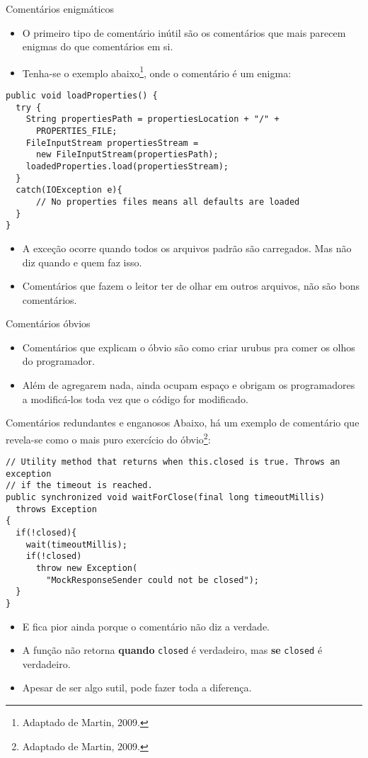 \documentclass[11pt]{beamer}
\begin{document}
  \begin{frame}[fragile]{Comentários enigmáticos}
    \begin{itemize}
      \item O primeiro tipo de comentário inútil são os comentários que mais parecem enigmas do que comentários em si.
      \item Tenha-se o exemplo abaixo\footnote{Adaptado de Martin, 2009.}, onde o comentário é um enigma: 
    \end{itemize}
    \begin{lstlisting}[basicstyle=\tiny]
public void loadProperties() {
  try {
    String propertiesPath = propertiesLocation + "/" +
      PROPERTIES_FILE;
    FileInputStream propertiesStream = 
      new FileInputStream(propertiesPath);
    loadedProperties.load(propertiesStream);
  }
  catch(IOException e){
      // No properties files means all defaults are loaded
  }
}
    \end{lstlisting}
    \begin{itemize}
      \item A exceção ocorre quando todos os arquivos padrão são carregados. Mas não diz quando e quem faz isso.
      \item Comentários que fazem o leitor ter de olhar em outros arquivos, não são bons comentários.
    \end{itemize}
  \end{frame}

  \begin{frame}{Comentários óbvios}
    \begin{itemize}
      \item Comentários que explicam o óbvio são como criar urubus pra comer os olhos do programador.
      \item Além de agregarem nada, ainda ocupam espaço e obrigam os programadores a modificá-los toda vez que o código for modificado.
    \end{itemize}
  \end{frame}

  \begin{frame}[fragile]{Comentários redundantes e enganosos}
    Abaixo, há um exemplo de comentário que revela-se como o mais puro exercício do óbvio\footnote{Adaptado de Martin, 2009.}:
    \begin{lstlisting}
// Utility method that returns when this.closed is true. Throws an exception
// if the timeout is reached.
public synchronized void waitForClose(final long timeoutMillis) 
  throws Exception
{
  if(!closed){
    wait(timeoutMillis);
    if(!closed)
      throw new Exception(
        "MockResponseSender could not be closed");
  }
}
    \end{lstlisting}
    \begin{itemize}
      \item E fica pior ainda porque o comentário não diz a verdade.
      \item A função não retorna \textbf{quando} \verb|closed| é verdadeiro, mas \textbf{se} \verb|closed| é verdadeiro.
      \item Apesar de ser algo sutil, pode fazer toda a diferença.
    \end{itemize}
  \end{frame}
\end{document}

